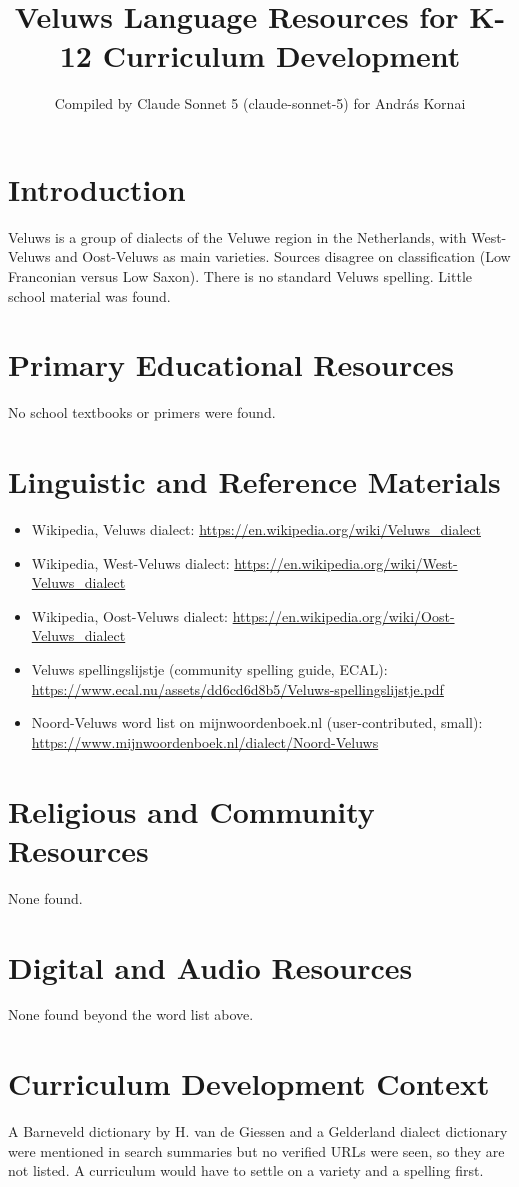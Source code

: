 \documentclass[12pt]{article}
\title{Veluws Language Resources for K-12 Curriculum Development}
\author{Compiled by Claude Sonnet 5 (claude-sonnet-5) for Andr\'as Kornai}
\date{}
\begin{document}
\maketitle
\section{Introduction}
Veluws is a group of dialects of the Veluwe region in the Netherlands, with West-Veluws and Oost-Veluws as main varieties. Sources disagree on classification (Low Franconian versus Low Saxon). There is no standard Veluws spelling. Little school material was found.
\section{Primary Educational Resources}
No school textbooks or primers were found.
\section{Linguistic and Reference Materials}
\begin{itemize}
\item Wikipedia, Veluws dialect: \url{https://en.wikipedia.org/wiki/Veluws_dialect}
\item Wikipedia, West-Veluws dialect: \url{https://en.wikipedia.org/wiki/West-Veluws_dialect}
\item Wikipedia, Oost-Veluws dialect: \url{https://en.wikipedia.org/wiki/Oost-Veluws_dialect}
\item Veluws spellingslijstje (community spelling guide, ECAL): \url{https://www.ecal.nu/assets/dd6cd6d8b5/Veluws-spellingslijstje.pdf}
\item Noord-Veluws word list on mijnwoordenboek.nl (user-contributed, small): \url{https://www.mijnwoordenboek.nl/dialect/Noord-Veluws}
\end{itemize}
\section{Religious and Community Resources}
None found.
\section{Digital and Audio Resources}
None found beyond the word list above.
\section{Curriculum Development Context}
A Barneveld dictionary by H. van de Giessen and a Gelderland dialect dictionary were mentioned in search summaries but no verified URLs were seen, so they are not listed. A curriculum would have to settle on a variety and a spelling first.
\end{document}
